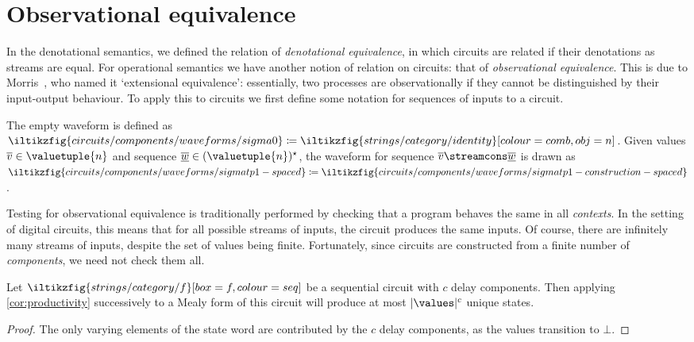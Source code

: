 \section{Observational equivalence}

In the denotational semantics, we defined the relation of
\emph{denotational equivalence}, in which circuits are related if their
denotations as streams are equal.
For operational semantics we have another notion of relation on circuits: that
of \emph{observational equivalence}.
This is due to Morris~\cite{morris1969lambdacalculus}, who named it
`extensional equivalence': essentially, two processes are observationally if they
cannot be distinguished by their input-output behaviour.
To apply this to circuits we first define some notation for sequences of inputs
to a circuit.

\begin{notation}[Waveform]\label{def:waveform}
    The empty waveform is defined as \(
    \iltikzfig{circuits/components/waveforms/sigma0}
    \coloneqq
    \iltikzfig{strings/category/identity}[colour=comb,obj=n]
    \).
    Given values \(\overline{v} \in \valuetuple{n}\) and sequence \(
    \overline{\underline{w}} \in (\valuetuple{n})^\star
    \), the waveform for sequence \(
    \overline{v} \streamcons \overline{\underline{w}}
    \) is drawn as \(
    \iltikzfig{circuits/components/waveforms/sigmatp1-spaced}
    \coloneqq
    \iltikzfig{circuits/components/waveforms/sigmatp1-construction-spaced}
    \).
\end{notation}

Testing for observational equivalence is traditionally performed by checking
that a program behaves the same in all \emph{contexts}.
In the setting of digital circuits, this means that for all possible streams of
inputs, the circuit produces the same inputs.
Of course, there are infinitely many streams of inputs, despite the set of
values being finite.
Fortunately, since circuits are constructed from a finite number of
\emph{components}, we need not check them all.

\begin{lemma}\label{lem:number-of-states}
    Let \(
    \iltikzfig{strings/category/f}[box=f,colour=seq]
    \) be a sequential circuit with \(c\) delay components.
    Then applying \cref{cor:productivity} successively to a Mealy form of this
    circuit will produce at most \(|\values|^c\) unique states.
\end{lemma}
\begin{proof}
    The only varying elements of the state word are contributed by
    the \(c\) delay components, as the values transition to \(\bot\).
\end{proof}


